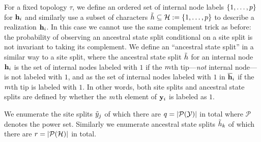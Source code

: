 For a fixed topology $\tau$, we define an ordered set of internal node labels $\{1,\ldots,p\}$ for $\mathbf{h}_i$ and similarly use a subset of characters $\tilde{h}\subseteq\mathcal{H}:=\{1,\ldots,p\}$ to describe a realization $\mathbf{h}_i$.
In this case we cannot use the same complement trick as before: the probability of observing an ancestral state split conditional on a site split is not invariant to taking its complement.
We define an ``ancestral state split'' in a similar way to a site split, where the ancestral state split $\tilde{h}$ for an internal node $\mathbf{h}_i$ is the set of internal nodes labeled with $1$ if the $m$th tip---\emph{not} internal node---is not labeled with $1$, and as the set of internal nodes labeled with $1$ in $\overline{\mathbf{h}}_i$ if the $m$th tip is labeled with $1$.
In other words, both site splits and ancestral state splits are defined by whether the $m$th element of $\mathbf{y}_i$ is labeled as $1$.

We enumerate the site splits $\tilde{y}_j$ of which there are $q=|\mathcal{P}(\mathcal{Y})|$ in total where $\mathcal{P}$ denotes the power set.
Similarly we enumerate ancestral state splits $\tilde{h}_k$ of which there are $r=|\mathcal{P}(\mathcal{H})|$ in total.

